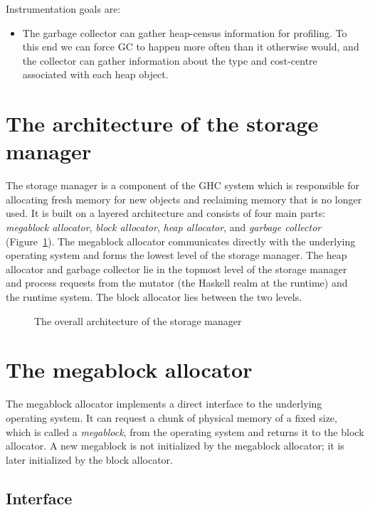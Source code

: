 \documentclass{article}
\begin{document}
Instrumentation goals are:
\begin{itemize}
\item The garbage collector can gather heap-census information for profiling.
To this end we can force GC to happen more often than it otherwise would,
and the collector can gather information about the type and cost-centre
associated with each heap object.
\end{itemize}

\section{The architecture of the storage manager}

The storage manager is a component of the GHC system which is responsible
for allocating fresh memory for new objects and reclaiming memory 
that is no longer used.
It is built on a layered architecture and consists of four main parts:
\emph{megablock allocator}, \emph{block allocator}, \emph{heap allocator}, 
and \emph{garbage collector} (Figure~\ref{fig-architecture}). 
The megablock allocator communicates directly with the underlying 
operating system and forms the lowest level of the storage manager.
The heap allocator and garbage collector lie in the topmost level of
the storage manager and process requests from 
the mutator (the Haskell realm at the runtime) and the runtime system.
The block allocator lies between the two levels. 

\begin{figure}[ht]
\begin{center}

\caption{The overall architecture of the storage manager}
\label{fig-architecture}
\end{center}
\end{figure}

\section{The megablock allocator}

The megablock allocator implements a direct interface to the underlying 
operating system. 
It can request a chunk of physical memory of a fixed size,
which is called a \emph{megablock}, from the operating system and returns it
to the block allocator. A new megablock is not initialized by the
megablock allocator; it is later initialized by the block allocator.

\subsection{Interface}
\end{document}
